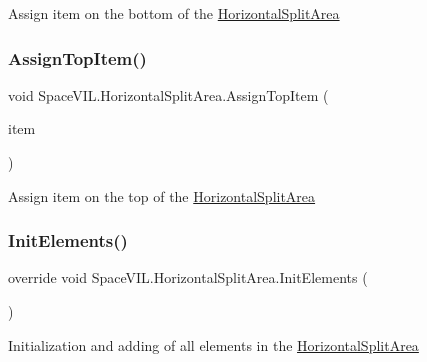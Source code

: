Assign item on the bottom of the \mbox{\hyperlink{class_space_v_i_l_1_1_horizontal_split_area}{Horizontal\+Split\+Area}} 

\mbox{\label{class_space_v_i_l_1_1_horizontal_split_area_aecce1e6d987c61a20f1ae41513becefc}} 
\subsubsection{\texorpdfstring{Assign\+Top\+Item()}{AssignTopItem()}}
{\footnotesize\ttfamily void Space\+V\+I\+L.\+Horizontal\+Split\+Area.\+Assign\+Top\+Item (\begin{DoxyParamCaption}\item[{\mbox{\hyperlink{interface_space_v_i_l_1_1_core_1_1_i_base_item}{I\+Base\+Item}}}]{item }\end{DoxyParamCaption})}



Assign item on the top of the \mbox{\hyperlink{class_space_v_i_l_1_1_horizontal_split_area}{Horizontal\+Split\+Area}} 

\mbox{\label{class_space_v_i_l_1_1_horizontal_split_area_ac977d45d7056f67bbd353877ff204df9}} 
\subsubsection{\texorpdfstring{Init\+Elements()}{InitElements()}}
{\footnotesize\ttfamily override void Space\+V\+I\+L.\+Horizontal\+Split\+Area.\+Init\+Elements (\begin{DoxyParamCaption}{ }\end{DoxyParamCaption})\hspace{0.3cm}{\ttfamily [virtual]}}



Initialization and adding of all elements in the \mbox{\hyperlink{class_space_v_i_l_1_1_horizontal_split_area}{Horizontal\+Split\+Area}} 



